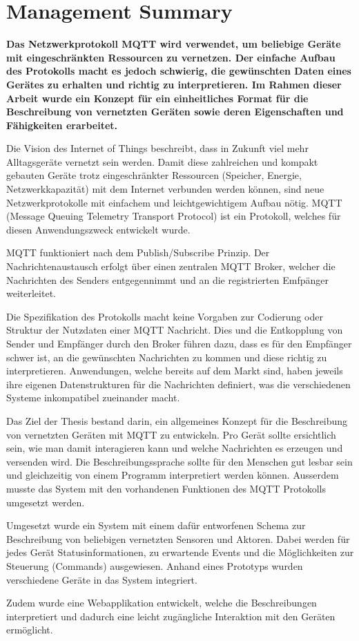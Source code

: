 \chapter*{Management Summary}
\label{chap:managementSummary}

\color{black}

\textbf{Das Netzwerkprotokoll MQTT wird verwendet, um beliebige Geräte mit eingeschränkten Ressourcen zu vernetzen. Der einfache Aufbau des Protokolls macht es jedoch schwierig, die gewünschten Daten eines Gerätes zu erhalten und richtig zu interpretieren. Im Rahmen dieser Arbeit wurde ein Konzept für ein einheitliches Format für die Beschreibung von vernetzten Geräten sowie deren Eigenschaften und Fähigkeiten erarbeitet.}


Die Vision des Internet of Things beschreibt, dass in Zukunft viel mehr Alltagsgeräte vernetzt sein werden. Damit diese zahlreichen und kompakt gebauten Geräte trotz eingeschränkter Ressourcen (Speicher, Energie, Netzwerkkapazität) mit dem Internet verbunden werden können, sind neue Netzwerkprotokolle mit einfachem und leichtgewichtigem Aufbau nötig. MQTT (Message Queuing Telemetry Transport Protocol) ist ein Protokoll, welches für diesen Anwendungszweck entwickelt wurde.

MQTT funktioniert nach dem Publish/Subscribe Prinzip. Der Nachrichtenaustausch erfolgt über einen zentralen MQTT Broker, welcher die Nachrichten des Senders entgegennimmt und an die registrierten Emfpänger weiterleitet.


Die Spezifikation des Protokolls macht keine Vorgaben zur Codierung oder Struktur der Nutzdaten einer MQTT Nachricht. Dies und die Entkopplung von Sender und Empfänger durch den Broker führen dazu, dass es für den Empfänger schwer ist, an die gewünschten Nachrichten zu kommen und diese richtig zu interpretieren. 
Anwendungen, welche bereits auf dem Markt sind, haben jeweils ihre eigenen Datenstrukturen für die Nachrichten definiert, was die verschiedenen Systeme inkompatibel zueinander macht.


Das Ziel der Thesis bestand darin, ein allgemeines Konzept für die Beschreibung von vernetzten Geräten mit MQTT zu entwickeln. Pro Gerät sollte ersichtlich sein, wie man damit interagieren kann und welche Nachrichten es erzeugen und versenden wird.
Die Beschreibungssprache sollte für den Menschen gut lesbar sein und gleichzeitig von einem Programm interpretiert werden können.
Ausserdem musste das System mit den vorhandenen Funktionen des MQTT Protokolls umgesetzt werden.


Umgesetzt wurde ein System mit einem dafür entworfenen Schema zur Beschreibung von beliebigen vernetzten Sensoren und Aktoren.
Dabei werden für jedes Gerät Statusinformationen, zu erwartende Events und die Möglichkeiten zur Steuerung (Commands) ausgewiesen. Anhand eines Prototyps wurden verschiedene Geräte in das System integriert.

Zudem wurde eine Webapplikation entwickelt, welche die Beschreibungen interpretiert und dadurch eine leicht zugängliche Interaktion mit den Geräten ermöglicht.